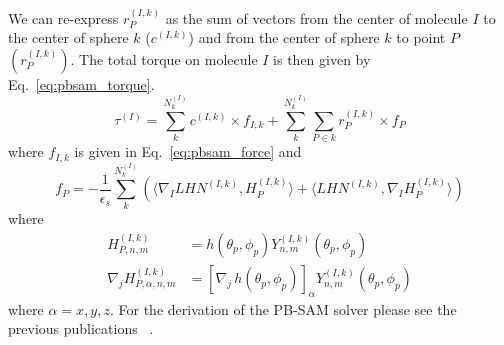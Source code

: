 \documentclass[12pt,titlepage]{article}
\begin{document}
We can re-express \(r_P^{(I,k)}\) as the sum of vectors from the center of molecule $I$ to the center of sphere \(k\) (\(c^{(I,k)}\)) and from the center of sphere \(k\) to point $P$ \((r_P^{(I,k)})\).
The total torque on molecule \(I\) is then given by Eq.~\ref{eq:pbsam_torque}.
%
\begin{equation}
	\tau^{(I)} =  \sum_{k}^{N_k^{(I)}} c^{(I,k)} \times   f_{I,k} + \sum_{k}^{N_k^{(I)}}  \sum_{P\in k} r_P^{(I,k)} \times f_P 
	\label{eq:pbsam_torque}
\end{equation}
%
where \(f_{I,k}\) is given in Eq.~\ref{eq:pbsam_force} and
%
\begin{equation}
	f_P = -  \frac{1}{\epsilon_s} \sum_{k}^{N_k^{(I)}}( \langle \nabla_I LHN^{(I,k)}, H_P^{(I,k)} \rangle +  \langle LHN^{(I,k)}, \nabla_I H_P^{(I,k)} \rangle)
	\label{eq:pbsam_torque_fp}
\end{equation}
%
where
\begin{align}
	H_{P,n,m}^{(I,k)} &= h(\theta_p, \phi_p) Y_{n,m}^{(I,k)} (\theta_p, \phi_p) 
	\label{eq:pbsam_hp} \\
	\nabla_j H_{P,\alpha, n,m}^{(I,k)} &= \left [ \nabla_j \, h(\theta_p, \phi_p) \right ]_{\alpha}   Y_{n,m}^{(I,k)} (\theta_p, \phi_p) 
	\label{eq:pbsam_derv_hp}
\end{align}
%
where \(\alpha = x , y, z\).
For the derivation of the PB-SAM solver please see the previous publications~\cite{Yap2010, Yap2013} .
\end{document}
